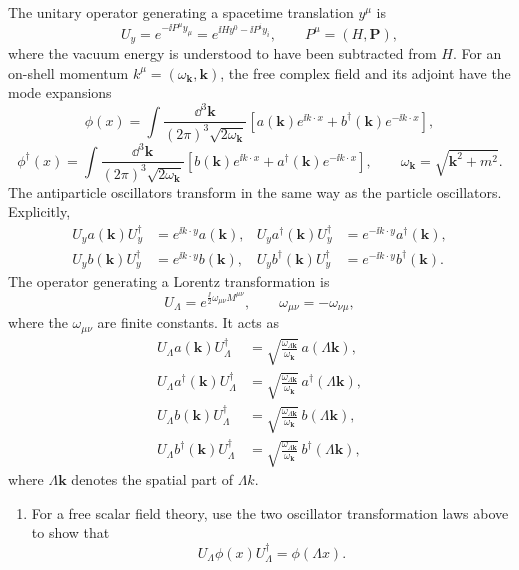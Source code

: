 \begin{enumerate}
The unitary operator generating a spacetime translation \(y^\mu\) is
\[
 U_y=e^{-\ii P^\mu y_\mu}=e^{\ii Hy^0-\ii P^iy_i},
 \qquad P^\mu=(H,\mathbf P),
\]
where the vacuum energy is understood to have been subtracted from \(H\).  For
an on-shell momentum \(k^\mu=(\omega_{\mathbf k},\mathbf k)\),
the free complex field and its adjoint have the mode expansions
\[
 \phi(x)=\int\frac{\dd^3\mathbf k}{(2\pi)^3\sqrt{2\omega_{\mathbf k}}}
 \left[a(\mathbf k)e^{\ii k\cdot x}
       +b^\dagger(\mathbf k)e^{-\ii k\cdot x}\right],
\]
\[
 \phi^\dagger(x)=\int\frac{\dd^3\mathbf k}{(2\pi)^3\sqrt{2\omega_{\mathbf k}}}
 \left[b(\mathbf k)e^{\ii k\cdot x}
       +a^\dagger(\mathbf k)e^{-\ii k\cdot x}\right],
 \qquad \omega_{\mathbf k}=\sqrt{\mathbf k^2+m^2}.
\]
The antiparticle oscillators transform in the same way as the particle
oscillators.  Explicitly,
\[
 \begin{aligned}
 U_y a(\mathbf k)U_y^\dagger&=e^{\ii k\cdot y}a(\mathbf k),&
 U_y a^\dagger(\mathbf k)U_y^\dagger&=e^{-\ii k\cdot y}a^\dagger(\mathbf k),\\
 U_y b(\mathbf k)U_y^\dagger&=e^{\ii k\cdot y}b(\mathbf k),&
 U_y b^\dagger(\mathbf k)U_y^\dagger&=e^{-\ii k\cdot y}b^\dagger(\mathbf k).
 \end{aligned}
\]
The operator generating a Lorentz transformation is
\[
 U_\Lambda=e^{\frac{\ii}{2}\omega_{\mu\nu}M^{\mu\nu}},
 \qquad \omega_{\mu\nu}=-\omega_{\nu\mu},
\]
where the \(\omega_{\mu\nu}\) are finite constants.  It acts as
\[
 \begin{split}
 U_\Lambda a(\mathbf k)U_\Lambda^\dagger
 &=\sqrt{\frac{\omega_{\Lambda\mathbf k}}{\omega_{\mathbf k}}}\,
   a(\Lambda\mathbf k),\\
 U_\Lambda a^\dagger(\mathbf k)U_\Lambda^\dagger
 &=\sqrt{\frac{\omega_{\Lambda\mathbf k}}{\omega_{\mathbf k}}}\,
   a^\dagger(\Lambda\mathbf k),
 \\
 U_\Lambda b(\mathbf k)U_\Lambda^\dagger
 &=\sqrt{\frac{\omega_{\Lambda\mathbf k}}{\omega_{\mathbf k}}}\,
   b(\Lambda\mathbf k),\\
 U_\Lambda b^\dagger(\mathbf k)U_\Lambda^\dagger
 &=\sqrt{\frac{\omega_{\Lambda\mathbf k}}{\omega_{\mathbf k}}}\,
   b^\dagger(\Lambda\mathbf k),
 \end{split}
\]
where \(\Lambda\mathbf k\) denotes the spatial part of \(\Lambda k\).

\begin{enumerate}
\item For a free scalar field theory, use the two oscillator transformation
laws above to show that
\[
 U_\Lambda\phi(x)U_\Lambda^\dagger=\phi(\Lambda x).
\]


\end{enumerate}
\end{enumerate}
